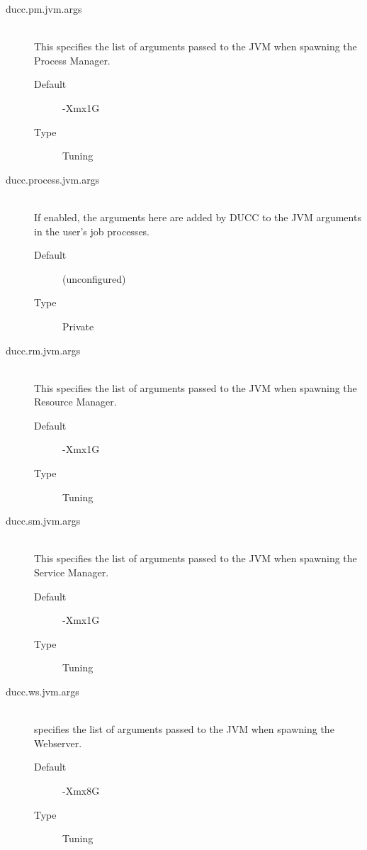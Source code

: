 \begin{description}
       \item[ducc.pm.jvm.args] \hfill \\
         This specifies the list of arguments passed to the JVM when spawning the Process Manager. 
         \begin{description}
           \item[Default] -Xmx1G 
           \item[Type] Tuning 
         \end{description}

       \item[ducc.process.jvm.args] \hfill \\
         If enabled, the arguments here are added by DUCC to the JVM arguments in the user's job 
         processes. 
         \begin{description}
           \item[Default] (unconfigured) 
           \item[Type] Private 
         \end{description}
                   
       \item[ducc.rm.jvm.args] \hfill \\
         This specifies the list of arguments passed to the JVM when spawning the Resource 
         Manager. 
         \begin{description}           
           \item[Default] -Xmx1G 
           \item[Type] Tuning 
         \end{description}

       \item[ducc.sm.jvm.args] \hfill \\
         This specifies the list of arguments passed to the JVM when spawning the Service Manager. 
         \begin{description}
           \item[Default] -Xmx1G 
           \item[Type] Tuning 
         \end{description}

       \item[ducc.ws.jvm.args] \hfill \\
         specifies the list of arguments passed to the JVM when spawning the
         Webserver.
         \begin{description}
           \item[Default] -Xmx8G 
           \item[Type] Tuning 
         \end{description}


\end{description}
